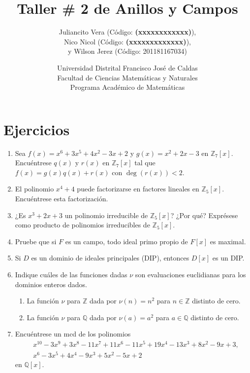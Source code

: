 \documentclass[12pt]{article}
\title{Taller \# 2 de Anillos y Campos}
\author{
    Juliancito Vera (Código: \textbf{(xxxxxxxxxxxx)}), \\
    Nico Nicol (Código: \textbf{(xxxxxxxxxxxxx)}), \\
    y Wilson Jerez (Código: 201181167034)
}
\date{
    Universidad Distrital Francisco José de Caldas \\
    Facultad de Ciencias Matemáticas y Naturales \\
    Programa Académico de Matemáticas
}
\theoremstyle{definition}
\theoremstyle{remark}
\begin{document}
\maketitle

\section*{Ejercicios}

\begin{enumerate}
    \item Sea $f(x) = x^6 + 3x^5 + 4x^2 - 3x + 2$ y $g(x) = x^2 + 2x - 3$ en $\mathbb{Z}_7[x]$. Encuéntrese $q(x)$ y $r(x)$ en $\mathbb{Z}_7[x]$ tal que $f(x) = g(x)q(x) + r(x)$ con $\deg(r(x)) < 2$.
    
    \item El polinomio $x^4 + 4$ puede factorizarse en factores lineales en $\mathbb{Z}_5[x]$. Encuéntrese esta factorización.
    
    \item ¿Es $x^3 + 2x + 3$ un polinomio irreducible de $\mathbb{Z}_5[x]$? ¿Por qué? Exprésese como producto de polinomios irreducibles de $\mathbb{Z}_5[x]$.
    
    \item Pruebe que si $F$ es un campo, todo ideal primo propio de $F[x]$ es maximal.
    
    \item Si $D$ es un dominio de ideales principales (DIP), entonces $D[x]$ es un DIP.
    
    \item Indique cuáles de las funciones dadas $\nu$ son evaluaciones euclidianas para los dominios enteros dados.
    \begin{enumerate}
        \item La función $\nu$ para $\mathbb{Z}$ dada por $\nu(n) = n^2$ para $n \in \mathbb{Z}$ distinto de cero.
        \item La función $\nu$ para $\mathbb{Q}$ dada por $\nu(a) = a^2$ para $a \in \mathbb{Q}$ distinto de cero.
    \end{enumerate}
    
    \item Encuéntrese un mcd de los polinomios
    \begin{align*}
        &x^{10} - 3x^9 + 3x^8 - 11x^7 + 11x^6 - 11x^5 + 19x^4 - 13x^3 + 8x^2 - 9x+ 3, \\
        &x^6 - 3x^5 + 4x^4 - 9x^3 + 5x^2 - 5x+ 2
    \end{align*}
    en $\mathbb{Q}[x]$.
    

\end{enumerate}
\end{document}
